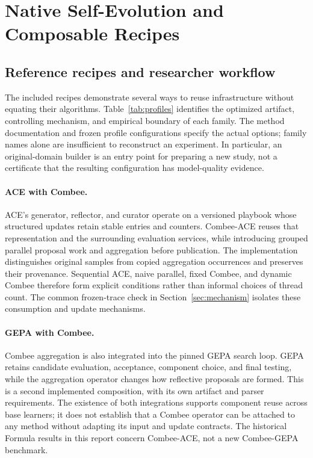 \section{Native Self-Evolution and Composable Recipes}
\label{sec:recipes}



\subsection{Reference recipes and researcher workflow}

The included recipes demonstrate several ways to reuse infrastructure without equating their algorithms. Table~\ref{tab:profiles} identifies the optimized artifact, controlling mechanism, and empirical boundary of each family. The method documentation and frozen profile configurations specify the actual options; family names alone are insufficient to reconstruct an experiment. In particular, an original-domain builder is an entry point for preparing a new study, not a certificate that the resulting configuration has model-quality evidence.



\paragraph{ACE with Combee.}
ACE's generator, reflector, and curator operate on a versioned playbook whose structured updates retain stable entries and counters. Combee-ACE reuses that representation and the surrounding evaluation services, while introducing grouped parallel proposal work and aggregation before publication. The implementation distinguishes original samples from copied aggregation occurrences and preserves their provenance. Sequential ACE, naive parallel, fixed Combee, and dynamic Combee therefore form explicit conditions rather than informal choices of thread count. The common frozen-trace check in Section~\ref{sec:mechanism} isolates these consumption and update mechanisms.

\paragraph{GEPA with Combee.}
Combee aggregation is also integrated into the pinned GEPA search loop. GEPA retains candidate evaluation, acceptance, component choice, and final testing, while the aggregation operator changes how reflective proposals are formed. This is a second implemented composition, with its own artifact and parser requirements. The existence of both integrations supports component reuse across base learners; it does not establish that a Combee operator can be attached to any method without adapting its input and update contracts. The historical Formula results in this report concern Combee-ACE, not a new Combee-GEPA benchmark.

